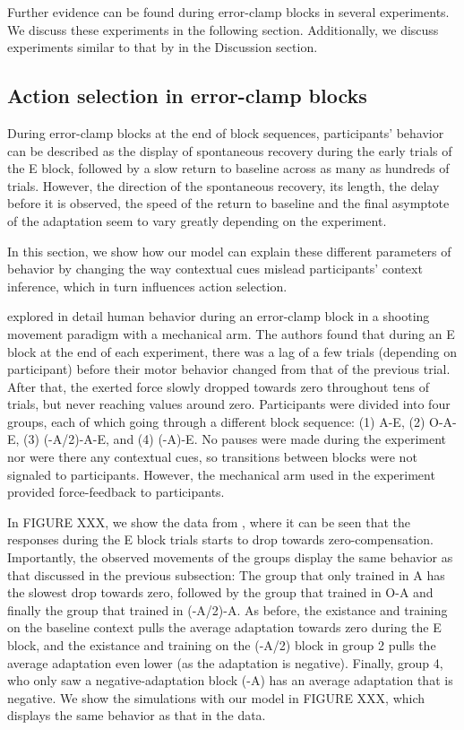 \documentclass[a4paper,doc,floatsintext,natbib]{apa6}
\begin{document}
Further evidence can be found during error-clamp blocks in several experiments. We discuss these experiments in the following section. Additionally, we discuss experiments similar to that by \cite{Davidson_Scaling_2004} in the Discussion section.


\subsection{Action selection in error-clamp blocks}
During error-clamp blocks at the end of block sequences, participants' behavior can be described as the display of spontaneous recovery during the early trials of the E block, followed by a slow return to baseline across as many as hundreds of trials. However, the direction of the spontaneous recovery, its length, the delay before it is observed, the speed of the return to baseline and the final asymptote of the adaptation seem to vary greatly depending on the experiment.

In this section, we show how our model can explain these different parameters of behavior by changing the way contextual cues mislead participants' context inference, which in turn influences action selection.

\cite{Vaswani_Decay_2013} explored in detail human behavior during an error-clamp block in a shooting movement paradigm with a mechanical arm. The authors found that during an E block at the end of each experiment, there was a lag of a few trials (depending on participant) before their motor behavior changed from that of the previous trial. After that, the exerted force slowly dropped towards zero throughout tens of trials, but never reaching values around zero. Participants were divided into four groups, each of which going through a different block sequence: (1) A-E, (2) O-A-E, (3) (-A/2)-A-E, and (4) (-A)-E. No pauses were made during the experiment nor were there any contextual cues, so transitions between blocks were not signaled to participants. However, the mechanical arm used in the experiment provided force-feedback to participants.

In FIGURE XXX, we show the data from \cite{Vaswani_Decay_2013}, where it can be seen that the responses during the E block trials starts to drop towards zero-compensation. Importantly, the observed movements of the groups display the same behavior as that discussed in the previous subsection: The group that only trained in A has the slowest drop towards zero, followed by the group that trained in O-A and finally the group that trained in (-A/2)-A. As before, the existance and training on the baseline context pulls the average adaptation towards zero during the E block, and the existance and training on the (-A/2) block in group 2 pulls the average adaptation even lower (as the adaptation is negative). Finally, group 4, who only saw a negative-adaptation block (-A) has an average adaptation that is negative. We show the simulations with our model in FIGURE XXX, which displays the same behavior as that in the data.
\end{document}

